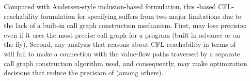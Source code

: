 Compared with Andersen-style inclusion-based formulation, 
this \manuLFC-based CFL-reachability formulation for
specifying 
suffers from two major limitations due to the lack of  a built-in call graph construction mechanism.
First,  may lose precision even if it uses the most precise call graph
for a program (built in advance or on the fly).
Second, any  analysis that reasons about  CFL-reachability in terms of \manuLFC will fail
to make a connection with
the value-flow paths traversed by a separate call graph construction
algorithm used, and consequently, may
make optimization decisions 
that reduce  the precision of  (among others).


\begin{comment}
In \cite{sridharan2005demand, sridharan2006refinement}, where the callsite-based CFL reachability formulation was first proposed for handling demand-driven pointer analysis, the authors has to resort to an additional algorithm for on-fly callgraph construction. However, in a considerable part of work, algorithm-assisted on-fly construction approaches are insufficient to complete their tasks. For instance, \selectx , a recent effort for \kcs{k} \cite{lu2021selective}, performs its context-sensitivity selection analysis in a pre-analysis stage and 
cannot rely on an expensive additional algorithm for on-fly dispatching. Consequently, \selectx suffers from a few precision losses.
Thus, a language-built-in formulation for on-fly callgraph construction is urgently required.
\end{comment}


